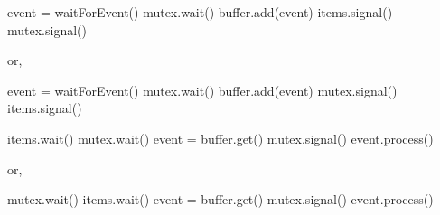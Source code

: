 \documentclass[varwidth=35em,crop]{standalone}
\begin{document}
\begin{minipage}{.35\linewidth}
\vspace{1em}
\begin{pythoncode}
event = waitForEvent()
mutex.wait()
    buffer.add(event)
    items.signal()
mutex.signal()
\end{pythoncode}
or,
\begin{pythoncode}
event = waitForEvent()
mutex.wait()
    buffer.add(event)
mutex.signal()
items.signal()      
\end{pythoncode}
\end{minipage}\qquad
\begin{minipage}{.38\linewidth}
\vspace{1em}
\begin{pythoncode}
items.wait()
mutex.wait()
    event = buffer.get()
mutex.signal()
event.process()
\end{pythoncode}
or,
\begin{pythoncode}
mutex.wait()
    items.wait()
    event = buffer.get()
mutex.signal()
event.process()
\end{pythoncode}
\end{minipage}
\end{document}
